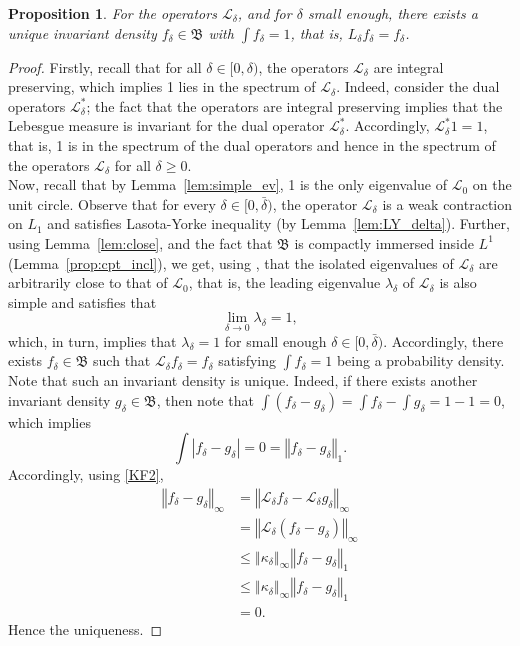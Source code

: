 \documentclass{amsart}
\newtheorem{proposition}[theorem]{Proposition}
\newcommand\cL{{\mathcal L}}
\newcommand\fB{{\mathfrak B}}
\newcommand{\norm}[1]{\left\Vert#1\right\Vert}
\begin{document}
\begin{proposition}\label{prop:inv_msr}
For the operators \(\cL_\delta\), and for $\delta $ small enough, there exists a unique invariant density $f_{\delta }\in \fB$ with $\int f_{\delta }=1$, that is, \(L_{\delta }f_{\delta }=f_{\delta }\).
  \end{proposition}
\begin{proof}
Firstly, recall that for all \(\delta\in[0,\delta)\), the operators \(\cL_\delta\) are integral preserving, which implies 1 lies in the spectrum of \(\cL_\delta\). Indeed, consider the dual operators \(\cL_\delta^*\); the fact that the operators are integral preserving implies that the Lebesgue measure is invariant for the dual operator \(\cL_\delta^*\). Accordingly, \(\cL_\delta^*1=1\), that is, 1 is in the spectrum of the dual operators and hence in the spectrum of the operators \(\cL_\delta\) for all \(\delta\geq 0\). \\
 Now, recall that by Lemma~\ref{lem:simple_ev}, 1 is the only eigenvalue of \(\cL_0\) on the unit circle.
Observe that for every \(\delta\in[0,\bar\delta)\), the operator \(\cL_\delta\) is a weak contraction on \(L_1\) and satisfies Lasota-Yorke inequality (by Lemma~\ref{lem:LY_delta}). Further, using Lemma~\ref{lem:close}, and the fact that \(\fB\) is compactly immersed inside \(L^1\) (Lemma~\ref{prop:cpt_incl}), we get, using \cite[Theorem 1]{KL}, that the isolated eigenvalues of \(\cL_\delta\) are arbitrarily close to that of \(\cL_0\), that is, the leading eigenvalue \(\lambda_\delta\) of \(\cL_\delta\) is also simple and satisfies that 
\[
\lim\limits_{\delta\to 0}\lambda_\delta = 1,
\] 
 which, in turn, implies that \(\lambda_\delta=1\) for small enough \(\delta\in[0,\bar\delta)\). Accordingly, there exists \(f_\delta\in \fB\) such that \(\cL_\delta f_\delta=f_\delta\) satisfying \(\int f_{\delta }=1\) being a probability density. Note that such an invariant density is unique. Indeed, if there exists another invariant density \(g_\delta\in\fB\), then note that \(\int(f_\delta-g_\delta)=\int f_\delta-\int g_\delta=1-1=0\), which implies 
 \[
 \int |f_\delta-g_\delta|=0=\norm{f_\delta-g_\delta}_1.
 \]
  Accordingly, using \eqref{KF2},
 \[
 \begin{split}
     \norm{f_\delta-g_\delta}_\infty
     &=\norm{\cL_\delta f_\delta-\cL_\delta g_\delta}_\infty\\
     &= \norm{\cL_\delta(f_\delta-g_\delta)}_\infty\\
     &\leq \norm{\kappa_\delta}_\infty\norm{f_\delta-g_\delta}_1\\
     &\leq \norm{\kappa_\delta}_\infty\norm{f_\delta-g_\delta}_1\\
     &= 0.
 \end{split}
 \]
 Hence the uniqueness.
\end{proof}
\end{document}
